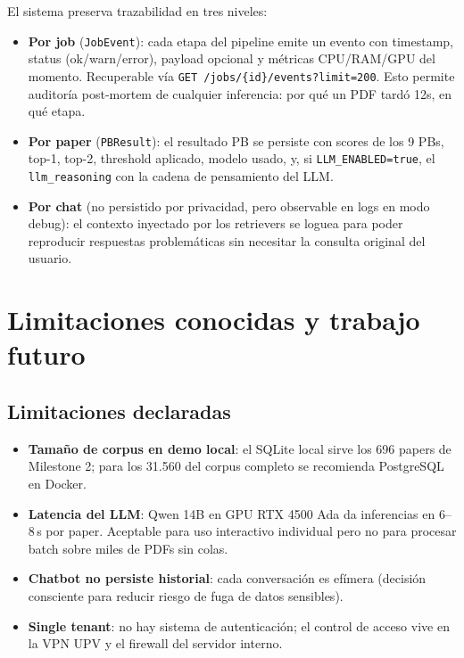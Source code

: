 \documentclass[11pt,a4paper]{article}
\newcommand{\modulo}[1]{\texttt{\textcolor{accent}{#1}}}
\begin{document}
El sistema preserva trazabilidad en tres niveles:

\begin{itemize}
\item \textbf{Por job} (\modulo{JobEvent}): cada etapa del pipeline emite un evento con timestamp, status (ok/warn/error), payload opcional y métricas CPU/RAM/GPU del momento. Recuperable vía \texttt{GET /jobs/\{id\}/events?limit=200}. Esto permite auditoría post-mortem de cualquier inferencia: por qué un PDF tardó 12s, en qué etapa.
\item \textbf{Por paper} (\modulo{PBResult}): el resultado PB se persiste con scores de los 9 PBs, top-1, top-2, threshold aplicado, modelo usado, y, si \texttt{LLM\_ENABLED=true}, el \texttt{llm\_reasoning} con la cadena de pensamiento del LLM.
\item \textbf{Por chat} (no persistido por privacidad, pero observable en logs en modo debug): el contexto inyectado por los retrievers se loguea para poder reproducir respuestas problemáticas sin necesitar la consulta original del usuario.
\end{itemize}

\section{Limitaciones conocidas y trabajo futuro}

\subsection{Limitaciones declaradas}

\begin{itemize}
\item \textbf{Tamaño de corpus en demo local}: el SQLite local sirve los 696 papers de Milestone 2; para los 31.560 del corpus completo se recomienda PostgreSQL en Docker.
\item \textbf{Latencia del LLM}: Qwen 14B en GPU RTX 4500 Ada da inferencias en 6--8\,s por paper. Aceptable para uso interactivo individual pero no para procesar batch sobre miles de PDFs sin colas.
\item \textbf{Chatbot no persiste historial}: cada conversación es efímera (decisión consciente para reducir riesgo de fuga de datos sensibles).
\item \textbf{Single tenant}: no hay sistema de autenticación; el control de acceso vive en la VPN UPV y el firewall del servidor interno.
\end{itemize}
\end{document}
